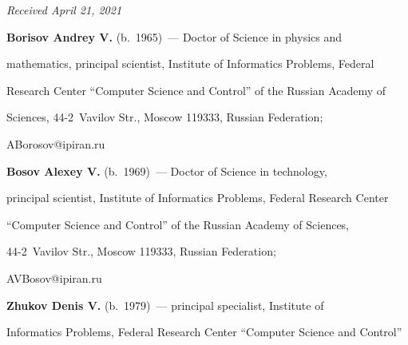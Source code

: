 \vspace*{-3pt}





\hfill{\small\textit{Received April 21, 2021}} 





\vspace*{-14pt}  





\Contr





\noindent


\textbf{Borisov Andrey V.} (b.\ 1965)~--- Doctor of Science in physics and 


mathematics, principal scientist, Institute of Informatics Problems, Federal 


Research Center ``Computer Science and Control'' of the Russian Academy of 


Sciences, 44-2~Vavilov Str., Moscow 119333, Russian Federation; 


\mbox{ABorosov@ipiran.ru}





\vspace*{3pt}





\noindent


\textbf{Bosov Alexey V.} (b.\ 1969)~--- Doctor of Science in technology, 


principal scientist, Institute of Informatics Problems, Federal Research Center 


``Computer Science and Control'' of the Russian Academy of Sciences,  


44-2~Vavilov Str., Moscow 119333, Russian Federation; 


\mbox{AVBosov@ipiran.ru}





\vspace*{3pt}





\noindent


\textbf{Zhukov Denis V.} (b.\ 1979)~--- principal specialist, Institute of 


Informatics Problems, Federal Research Center ``Computer Science and Control'' 


